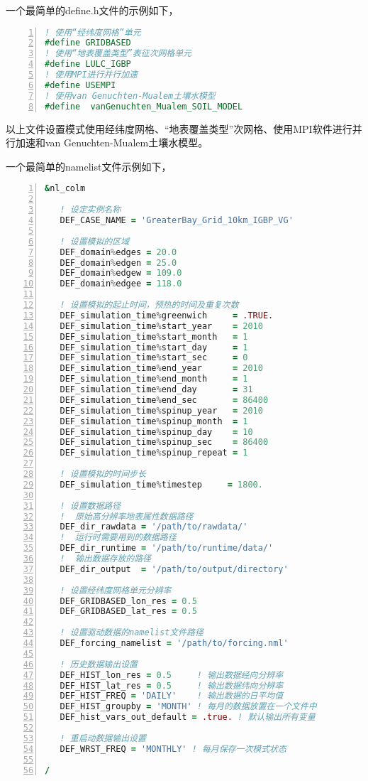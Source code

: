 \documentclass[a4paper,12pt,twoside]{article}
\begin{document}
一个最简单的define.h文件的示例如下，
\begin{lstlisting}[language=fortran, basicstyle=\linespread{1.2}\small\ttfamily, commentstyle=\color{olive}, numbers=left, numberstyle=\tiny, xleftmargin=1.5em,xrightmargin=0em, aboveskip=1em]
! 使用“经纬度网格”单元
#define GRIDBASED
! 使用“地表覆盖类型”表征次网格单元
#define LULC_IGBP
! 使用MPI进行并行加速
#define USEMPI
! 使用van Genuchten-Mualem土壤水模型
#define  vanGenuchten_Mualem_SOIL_MODEL
\end{lstlisting}

以上文件设置模式使用经纬度网格、“地表覆盖类型”次网格、使用MPI软件进行并行加速和van Genuchten-Mualem土壤水模型。

一个最简单的namelist文件示例如下，
\begin{lstlisting}[language=fortran, basicstyle=\linespread{1.2}\small\ttfamily, commentstyle=\color{olive}, numbers=left, numberstyle=\tiny, xleftmargin=1.5em,xrightmargin=0em, aboveskip=1em]
&nl_colm

   ! 设定实例名称
   DEF_CASE_NAME = 'GreaterBay_Grid_10km_IGBP_VG'

   ! 设置模拟的区域
   DEF_domain%edges = 20.0
   DEF_domain%edgen = 25.0
   DEF_domain%edgew = 109.0
   DEF_domain%edgee = 118.0

   ! 设置模拟的起止时间，预热的时间及重复次数
   DEF_simulation_time%greenwich     = .TRUE.
   DEF_simulation_time%start_year    = 2010
   DEF_simulation_time%start_month   = 1
   DEF_simulation_time%start_day     = 1
   DEF_simulation_time%start_sec     = 0
   DEF_simulation_time%end_year      = 2010
   DEF_simulation_time%end_month     = 1
   DEF_simulation_time%end_day       = 31
   DEF_simulation_time%end_sec       = 86400
   DEF_simulation_time%spinup_year   = 2010
   DEF_simulation_time%spinup_month  = 1
   DEF_simulation_time%spinup_day    = 10
   DEF_simulation_time%spinup_sec    = 86400
   DEF_simulation_time%spinup_repeat = 1

   ! 设置模拟的时间步长
   DEF_simulation_time%timestep     = 1800.

   ! 设置数据路径
   !  原始高分辨率地表属性数据路径
   DEF_dir_rawdata = '/path/to/rawdata/'   
   !  运行时需要用到的数据路径
   DEF_dir_runtime = '/path/to/runtime/data/'   
   !  输出数据存放的路径
   DEF_dir_output  = '/path/to/output/directory'  

   ! 设置经纬度网格单元分辨率
   DEF_GRIDBASED_lon_res = 0.5
   DEF_GRIDBASED_lat_res = 0.5

   ! 设置驱动数据的namelist文件路径
   DEF_forcing_namelist = '/path/to/forcing.nml'

   ! 历史数据输出设置
   DEF_HIST_lon_res = 0.5     ! 输出数据经向分辨率
   DEF_HIST_lat_res = 0.5     ! 输出数据纬向分辨率
   DEF_HIST_FREQ = 'DAILY'    ! 输出数据的日平均值
   DEF_HIST_groupby = 'MONTH' ! 每月的数据放置在一个文件中
   DEF_hist_vars_out_default = .true. ! 默认输出所有变量

   ! 重启动数据输出设置
   DEF_WRST_FREQ = 'MONTHLY' ! 每月保存一次模式状态

/
\end{lstlisting}
\end{document}
